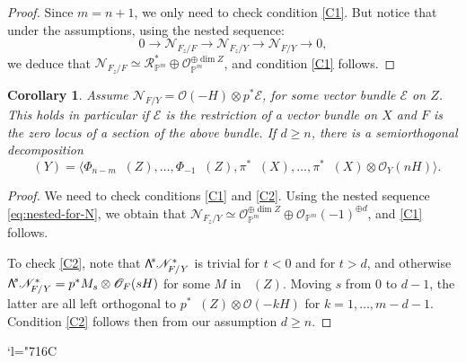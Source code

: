 \documentclass[11pt]{article}
\providecommand{\backmatter}{}
\newcommand{\Changelback}{\mathcode`l="716C}
\newcommand\bw[1]{{\hbox{\large$\mathsf{\Lambda}$}^{\!#1}}}
\let\mathcal\mathscr
\theoremstyle{plain}
\newtheorem{cor}[theorem]{Corollary}
\theoremstyle{definition}
\newcommand{\cat}[1]{\mathsf{#1}}
\newcommand{\sod}[1]{\langle #1 \rangle}
\DeclareMathOperator{\Db}{{\cat{D}^{\mathrm{b}}}}
\newcommand{\PP}{\mathbb{P}}
\newcommand{\sheaf}[1]{\mathcal{#1}}
\newcommand{\ke}{\sheaf{E}}
\newcommand{\kn}{\sheaf{N}}
\newcommand{\ko}{\sheaf{O}}\let\OO\ko\let\cO\ko
\newcommand{\kr}{\sheaf{R}}
\begin{document}
\begin{proof}
Since $m=n+1$, we only need to check condition \eqref{C1}. But notice that under the assumptions,
using the nested sequence:
\begin{equation}\label{eq:nested-for-N}
0 \to \kn_{F_z/F} \to \kn_{F_z/Y} \to \kn_{F/Y} \to 0,
\end{equation}
we deduce that $\kn_{F_z/F} \simeq \kr^*_{\PP^m} \oplus \ko_{\PP^m}^{\oplus \dim Z}$, and
condition \eqref{C1} follows.
\end{proof}

\begin{cor}
Assume $\kn_{F/Y} = \ko(-H) \otimes p^* \ke$, for some vector bundle $\ke$ on $Z$. This
holds in particular if $\ke$ is the restriction of a vector bundle on $X$ and $F$ is the
zero locus of a section of the above bundle. If $d \geq n$, there is a semiorthogonal
decomposition
\[
\Db(Y)=\sod{\Phi_{n-m}\Db(Z),\ldots,\Phi_{-1}\Db(Z),\pi^*\Db(X),\ldots,\pi^*\Db(X)\otimes \ko_Y(nH)}.
\]
\end{cor}

\begin{proof}
We need to check conditions \eqref{C1} and \eqref{C2}.
Using the nested sequence \eqref{eq:nested-for-N}, we obtain that
$\kn_{F_z/Y} \simeq \ko_{\PP^m}^{\oplus \dim Z} \oplus \ko_{\PP^m}(-1)^{\oplus d}$, and
\eqref{C1} follows.

To check \eqref{C2}, note that $\bw{s} \kn_{F/Y}^*$ is trivial for $t<0$ and for $t>d$, and otherwise
$\bw{s} \kn_{F/Y}^*=p^*M_s \otimes \ko_F(sH)$ for some $M$ in $\Db(Z)$.
Moving $s$ from $0$ to $d-1$, the latter are all left orthogonal to $p^*\Db(Z)\otimes\ko(-kH)$ for
$k=1,\ldots,m-d-1$. Condition \eqref{C2} follows then from our assumption $d \geq n$.
\end{proof}

\Changelback
\backmatter

\end{document}
